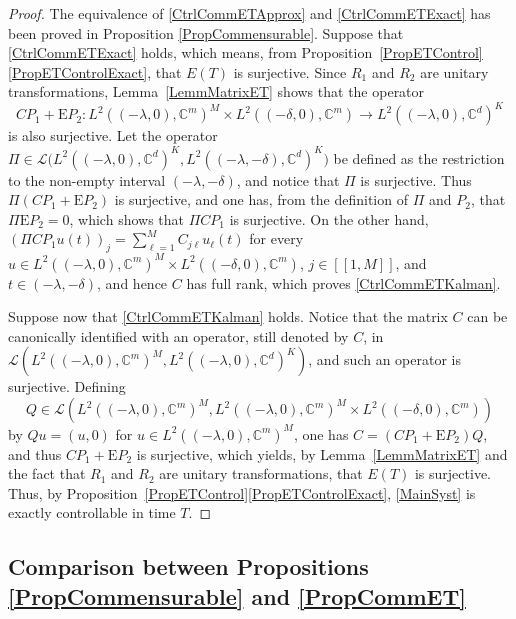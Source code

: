 \documentclass[10pt]{article}
\newcommand{\llbracket}{[\![}
\newcommand{\rrbracket}{]\!]}
\theoremstyle{plain}
\theoremstyle{definition}
\newcommand{\Epsilon}{\mathrm E}
\numberwithin{equation}{section}\numberwithin{figure}{section}\emergencystretch=3em
\begin{document}
\begin{proof}
The equivalence of \eqref{CtrlCommETApprox} and \eqref{CtrlCommETExact} has been proved in Proposition \ref{PropCommensurable}. Suppose that \eqref{CtrlCommETExact} holds, which means, from Proposition~\ref{PropETControl}\eqref{PropETControlExact}, that $E(T)$ is surjective. Since $R_1$ and $R_2$ are unitary transformations, Lemma~\ref{LemmMatrixET} shows that the operator
\[
C P_1 + \Epsilon P_2: L^2((-\lambda, 0), \mathbb C^m)^M \times L^2((-\delta, 0), \mathbb C^m) \to L^2((-\lambda, 0), \mathbb C^d)^K
\]
is also surjective. Let the operator $\Pi \in \mathcal L\bigl(L^2((-\lambda, 0), \mathbb C^d)^K, L^2((-\lambda, -\delta), \mathbb C^d)^K\bigr)$ be defined as the restriction to the non-empty interval $(-\lambda, -\delta)$, and notice that $\Pi$ is surjective. Thus $\Pi(C P_1 + \Epsilon P_2)$ is surjective, and one has, from the definition of $\Pi$ and $P_2$, that $\Pi \Epsilon P_2 = 0$, which shows that $\Pi C P_1$ is surjective. On the other hand, $(\Pi C P_1 u(t))_j = \sum_{\ell=1}^M C_{j\ell} u_\ell(t)$ for every $u \in L^2((-\lambda, 0), \mathbb C^m)^M \times L^2((-\delta, 0), \mathbb C^m)$, $j \in \llbracket 1, M\rrbracket$, and $t \in (-\lambda, -\delta)$, and hence $C$ has full rank, which proves \eqref{CtrlCommETKalman}.

Suppose now that \eqref{CtrlCommETKalman} holds. Notice that the matrix $C$ can be canonically identified with an operator, still denoted by $C$, in $\mathcal L\left(L^2((-\lambda, 0), \mathbb C^m)^M, L^2((-\lambda, 0), \mathbb C^d)^K\right)$, and such an operator is surjective. Defining
\[
Q \in \mathcal L(L^2((-\lambda, 0), \mathbb C^m)^M, L^2((-\lambda, 0), \mathbb C^m)^M \times L^2((-\delta, 0), \mathbb C^m))
\]
by $Q u = (u, 0)$ for $u \in L^2((-\lambda, 0), \mathbb C^m)^M$, one has $C = (C P_1 + \Epsilon P_2) Q$, and thus $C P_1 + \Epsilon P_2$ is surjective, which yields, by Lemma~\ref{LemmMatrixET} and the fact that $R_1$ and $R_2$ are unitary transformations, that $E(T)$ is surjective. Thus, by Proposition~\ref{PropETControl}\eqref{PropETControlExact}, \eqref{MainSyst} is exactly controllable in time $T$.
\end{proof}

\subsection{Comparison between Propositions \ref{PropCommensurable} and \ref{PropCommET}}
\end{document}
